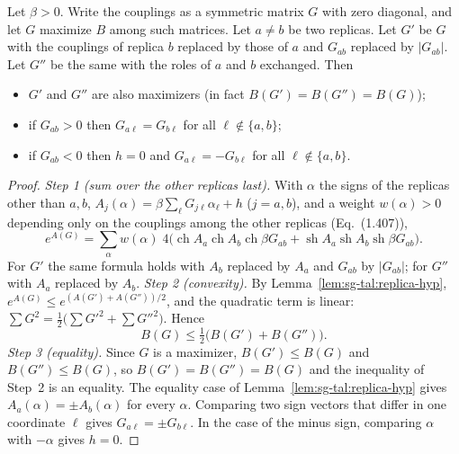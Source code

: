 \begin{lemma}\label{lem:sg-tal:replica-collapse}
\leanok
{}
Let $\beta>0$. Write the couplings as a symmetric matrix $G$ with zero diagonal, and let $G$ maximize $B$ among such matrices. Let $a\ne b$ be two replicas.
Let $G'$ be $G$ with the couplings of replica $b$ replaced by those of $a$ and $G_{ab}$ replaced by $|G_{ab}|$. Let $G''$ be the same with the roles of $a$ and $b$ exchanged. Then
\begin{itemize}
\item $G'$ and $G''$ are also maximizers (in fact $B(G')=B(G'')=B(G)$);
\item if $G_{ab}>0$ then $G_{a\ell}=G_{b\ell}$ for all $\ell\notin\{a,b\}$;
\item if $G_{ab}<0$ then $h=0$ and $G_{a\ell}=-G_{b\ell}$ for all $\ell\notin\{a,b\}$.
\end{itemize}
\end{lemma}
\begin{proof}
\leanok
\emph{Step 1 (sum over the other replicas last).} With $\alpha$ the signs of the replicas other than $a,b$, $A_j(\alpha)=\beta\sum_\ell G_{j\ell}\alpha_\ell+h$ ($j=a,b$), and a weight $w(\alpha)>0$ depending only on the couplings among the other replicas (Eq.~(1.407)),
\[
e^{A(G)}=\sum_\alpha w(\alpha)\;4\Big(\operatorname{ch}A_a\operatorname{ch}A_b\operatorname{ch}\beta G_{ab}+\operatorname{sh}A_a\operatorname{sh}A_b\operatorname{sh}\beta G_{ab}\Big).
\]
For $G'$ the same formula holds with $A_b$ replaced by $A_a$ and $G_{ab}$ by $|G_{ab}|$; for $G''$ with $A_a$ replaced by $A_b$.
\emph{Step 2 (convexity).} By Lemma~\ref{lem:sg-tal:replica-hyp}, $e^{A(G)}\le e^{(A(G')+A(G''))/2}$, and the quadratic term is linear: $\sum G^2=\frac12\big(\sum G'^2+\sum G''^2\big)$. Hence
\[
B(G)\le\tfrac12\big(B(G')+B(G'')\big).
\]
\emph{Step 3 (equality).} Since $G$ is a maximizer, $B(G')\le B(G)$ and $B(G'')\le B(G)$, so $B(G')=B(G'')=B(G)$ and the inequality of Step~2 is an equality. The equality case of Lemma~\ref{lem:sg-tal:replica-hyp} gives $A_a(\alpha)=\pm A_b(\alpha)$ for every $\alpha$. Comparing two sign vectors that differ in one coordinate $\ell$ gives $G_{a\ell}=\pm G_{b\ell}$. In the case of the minus sign, comparing $\alpha$ with $-\alpha$ gives $h=0$.
\end{proof}

